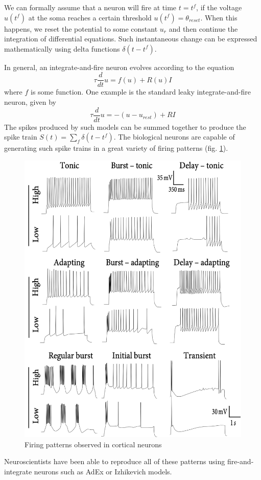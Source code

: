\documentclass[oneside,english,logo]{amuthesis}
\begin{document}
We can formally assume that a neuron will fire at time $t=t^f$, if the voltage $u(t^f)$ at the soma reaches a certain threshold $u(t^f)=\theta_{reset}$. When this happens, we reset the potential to some constant $u_r$ and then continue the integration of differential equations. Such instantaneous change can be expressed mathematically using delta functions $\delta(t-t^f)$. 

In general, an integrate-and-fire neuron evolves according to the equation
\[
\tau \frac{d}{dt}u = f(u) + R(u)I
\]
where $f$ is some function. One example is the standard leaky integrate-and-fire neuron, given by
\[
\tau \frac{d}{dt}u = -(u-u_{rest}) + R I
\]
The spikes produced by such models can be summed together to produce the spike train $S(t)=\sum_f \delta(t-t^f)$. The biological neurons are capable of generating such spike trains in a great variety of firing patterns (fig. \ref{fig:cortial_spike_patterns}).
\begin{figure}[!htbp]
	\centering
	\includegraphics[width=13cm]{cortial_spike_patterns}
	\caption{Firing patterns observed in cortical neurons}
	\label{fig:cortial_spike_patterns}
\end{figure}
Neuroscientists have been able to reproduce all of these patterns using fire-and-integrate neurons such as AdEx or Izhikevich models.
\end{document}
